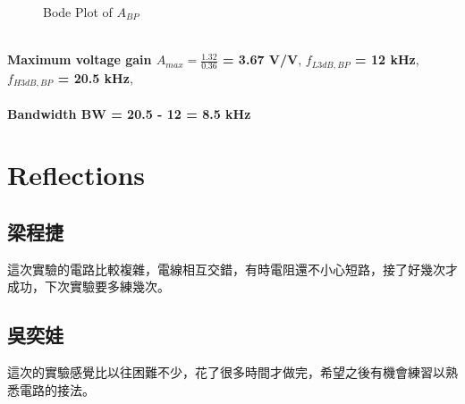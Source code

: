 \documentclass{article}
\begin{document}
\begin{CJK*}{UTF8}{bkai}
\begin{minipage}{0.5\textwidth}
\begin{figure}[H]
        \caption{Bode Plot of $A_{BP}$}
    \end{figure}
\end{minipage}
\vspace{3mm}\\
\textbf{Maximum voltage gain $A_{max} = \frac{1.32}{0.36}$ = 3.67 V/V}, \textbf{$f_{L3dB,BP}$ = 12 \unit{\kilo\hertz}}, \textbf{$f_{H3dB,BP}$ = 20.5 \unit{\kilo\hertz}},\\
\vspace*{1mm}\\
\textbf{Bandwidth BW = 20.5 - 12 = 8.5 \unit{\kilo\hertz}}

\section*{Reflections}
\subsection*{梁程捷}
這次實驗的電路比較複雜，電線相互交錯，有時電阻還不小心短路，接了好幾次才成功，下次實驗要多練幾次。
\subsection*{吳奕娃}
這次的實驗感覺比以往困難不少，花了很多時間才做完，希望之後有機會練習以熟悉電路的接法。
\end{CJK*}
\end{document}
